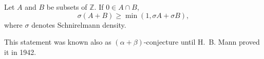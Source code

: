 \documentclass[12pt]{article}
\begin{document}
Let $A$ and $B$ be subsets of $\mathbb{Z}$. If $0 \in A \cap B$,
\begin{equation*}
\sigma(A+B)\geq \min(1,\sigma A + \sigma B),
\end{equation*}
where $\sigma$ denotes Schnirelmann density.

This statement was known also as $(\alpha+\beta)$-conjecture until H.~B. Mann proved it in 1942.
\end{document}
